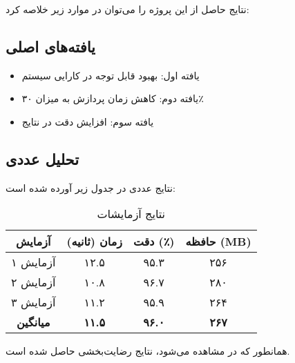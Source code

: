 نتایج حاصل از این پروژه را می‌توان در موارد زیر خلاصه کرد:

\subsection{یافته‌های اصلی}
\begin{itemize}
    \item یافته اول: بهبود قابل توجه در کارایی سیستم
    \item یافته دوم: کاهش زمان پردازش به میزان ۳۰٪
    \item یافته سوم: افزایش دقت در نتایج
\end{itemize}

\subsection{تحلیل عددی}
نتایج عددی در جدول زیر آورده شده است:

\begin{table}[h]
\centering
\caption{نتایج آزمایشات}
\label{tab:results}
\begin{tabular}{|c|c|c|c|}
\hline
\textbf{آزمایش} & \textbf{زمان (ثانیه)} & \textbf{دقت (٪)} & \textbf{حافظه (MB)} \\
\hline
آزمایش ۱ & ۱۲.۵ & ۹۵.۳ & ۲۵۶ \\
\hline
آزمایش ۲ & ۱۰.۸ & ۹۶.۷ & ۲۸۰ \\
\hline
آزمایش ۳ & ۱۱.۲ & ۹۵.۹ & ۲۶۴ \\
\hline
\textbf{میانگین} & \textbf{۱۱.۵} & \textbf{۹۶.۰} & \textbf{۲۶۷} \\
\hline
\end{tabular}
\end{table}

همانطور که در  مشاهده می‌شود، نتایج رضایت‌بخشی حاصل شده است.

